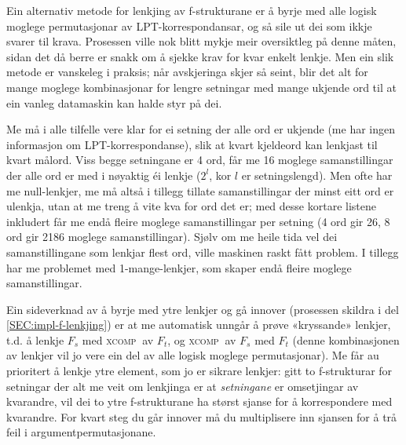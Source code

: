 \documentclass[11pt,a4paper,oneside,draft]{book}
\newcommand{\F}[2]{\textsc{#1}\ensuremath{_{#2}}}
\newcommand{\XCOMPs}{\F{xcomp~}{}}
\begin{document}
Ein alternativ metode for lenkjing av f-strukturane er å byrje med
alle logisk moglege permutasjonar av LPT-korrespondansar, og så sile
ut dei som ikkje svarer til krava. Prosessen ville nok blitt mykje
meir oversiktleg på denne måten, sidan det då berre er snakk om å
sjekke krav for kvar enkelt lenkje.  Men ein slik metode er vanskeleg
i praksis; når avskjeringa skjer så seint, blir det alt for mange
moglege kombinasjonar for lengre setningar med mange ukjende ord til
at ein vanleg datamaskin kan halde styr på dei.

Me må i alle tilfelle vere klar for ei setning der alle ord er ukjende
(me har ingen informasjon om LPT-korrespondanse), slik at kvart
kjeldeord kan lenkjast til kvart målord. Viss begge setningane er 4 ord,
får me 16 moglege samanstillingar der alle ord er med i nøyaktig éi
lenkje ($2^l$, kor $l$ er setningslengd). Men ofte har me
null-lenkjer, me må altså i tillegg tillate samanstillingar der minst
eitt ord er ulenkja, utan at me treng å vite kva for ord det er; med
desse kortare listene inkludert får me endå fleire moglege
samanstillingar per setning (4 ord gir 26, 8 ord gir 2186 moglege
samanstillingar). Sjølv om me heile tida vel dei samanstillingane som
lenkjar flest ord, ville maskinen raskt fått problem. I tillegg har me
problemet med 1-mange-lenkjer, som skaper endå fleire moglege
samanstillingar.

Ein sideverknad av å byrje med ytre lenkjer og gå innover (prosessen
skildra i del \ref{SEC:impl-f-lenkjing}) er at me automatisk unngår å
prøve «kryssande» lenkjer, t.d. å lenkje $F_s$ med \XCOMPs av $F_t$, og
\XCOMPs av $F_s$ med $F_t$ (denne kombinasjonen av lenkjer vil jo vere
ein del av alle logisk moglege permutasjonar). Me får au prioritert å
lenkje ytre element, som jo er sikrare lenkjer: gitt to f-strukturar
for setningar der alt me veit om lenkjinga er at \emph{setningane} er
omsetjingar av kvarandre, vil dei to ytre f-strukturane ha størst
sjanse for å korrespondere med kvarandre. For kvart steg du går
innover må du multiplisere inn sjansen for å trå feil i
argumentpermutasjonane.
\end{document}
